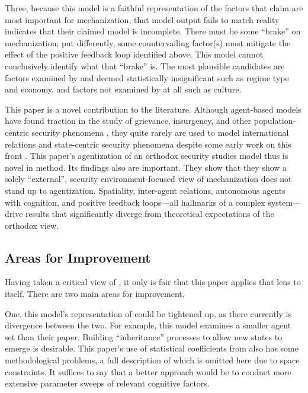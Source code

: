 \documentclass{article}
\begin{document}
Three, because this model is a
faithful representation of the factors that \citet{sechser2010army} claim are
most important for mechanization, that model output fails to match reality
indicates that their claimed model is incomplete. There must be some ``brake''
on mechanization; put differently, some countervailing factor(s) must mitigate the
effect of the positive feedback loop identified above. This model cannot
conclusively identify what that ``brake'' is. The most plausible candidates are
factors examined by \citet{sechser2010army} and deemed statistically
insignificant such as regime type and economy, and factors not examined by
\citet{sechser2010army} at all such as culture.

This paper is a novel contribution to the literature. Although agent-based
models have found traction in the study of grievance, insurgency, and
other population-centric security phenomena \citep[e.g.][]{epstein2002modeling},
they quite rarely are used to model international relations and state-centric security
phenomena despite some early work on this front
\citep[see][]{cederman1997emergent,axelrod1997complexity}. 
This paper's agentization of an orthodox security
studies model thus is novel in method. Its findings also are important. They
show that they show a solely ``external'', security
environment-focused view of mechanization does not stand up to agentization.
Spatiality, inter-agent relations, autonomous agents with cognition, and positive feedback
loops---all hallmarks of a complex system---drive results that significantly
diverge from theoretical expectations of the orthodox view.

\subsection{Areas for Improvement}

Having taken a critical view of \citet{sechser2010army}, it only is fair that
this paper applies that lens to itself. There are two main areas for
improvement.

One, this model's representation of \citet{sechser2010army} could be tightened
up, as there currently is divergence between the two. For example, this model
examines a smaller agent set than their paper. Building ``inheritance''
processes to allow new states to emerge is desirable. This paper's
use of statistical coefficients from \citet{sechser2010army} also has some
methodological problems, a full description of which is omitted here due to
space constraints. It suffices to say that a better approach would be to conduct
more extensive parameter sweeps of relevant cognitive factors.
\end{document}
